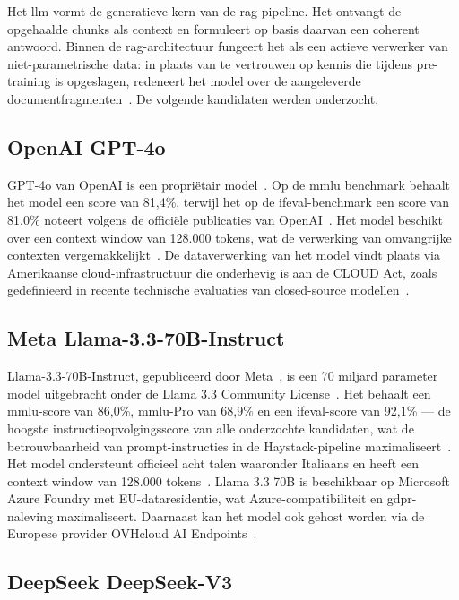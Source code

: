 Het \gls{llm} vormt de generatieve kern van de \gls{rag}-pipeline. Het ontvangt de opgehaalde chunks als context en formuleert op basis daarvan een coherent antwoord. Binnen de \gls{rag}-architectuur fungeert het als een actieve verwerker van niet-parametrische data: in plaats van te vertrouwen op kennis die tijdens pre-training is opgeslagen, redeneert het model over de aangeleverde documentfragmenten~\autocite{Lewis2020}. De volgende kandidaten werden onderzocht.

\subsection{OpenAI GPT-4o}

GPT-4o van OpenAI is een propriëtair model~\autocite{OpenAI2024}. Op de \gls{mmlu} benchmark behaalt het model een score van 81,4\%, terwijl het op de \gls{ifeval}-benchmark een score van 81,0\% noteert volgens de officiële publicaties van OpenAI~\autocite{OpenAI2024}. Het model beschikt over een context window van 128.000 tokens, wat de verwerking van omvangrijke contexten vergemakkelijkt~\autocite{OpenAI2025}. De dataverwerking van het model vindt plaats via Amerikaanse cloud-infrastructuur die onderhevig is aan de CLOUD Act, zoals gedefinieerd in recente technische evaluaties van closed-source modellen~\autocite{HuangEtAl2024}.

\subsection{Meta Llama-3.3-70B-Instruct}

Llama-3.3-70B-Instruct, gepubliceerd door Meta~\autocite{GrattafioriEtAl2024}, is een 70 miljard parameter model uitgebracht onder de Llama 3.3 Community License~\autocite{Meta2025}. Het behaalt een \gls{mmlu}-score van 86,0\%, \gls{mmlu}-Pro van 68,9\% en een \gls{ifeval}-score van 92,1\% — de hoogste instructieopvolgingsscore van alle onderzochte kandidaten, wat de betrouwbaarheid van prompt-instructies in de Haystack-pipeline maximaliseert~\autocite{Metazd}. Het model ondersteunt officieel acht talen waaronder Italiaans en heeft een context window van 128.000 tokens~\autocite{Metazd}. Llama 3.3 70B is beschikbaar op Microsoft Azure Foundry met EU-dataresidentie, wat Azure-compatibiliteit en \gls{gdpr}-naleving maximaliseert. Daarnaast kan het model ook gehost worden via de Europese provider OVHcloud AI Endpoints~\autocite{Metazd}.

\subsection{DeepSeek DeepSeek-V3}

